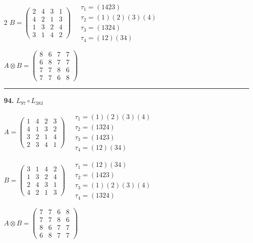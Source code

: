 \begin{multicols}{2}
$B = \begin{pmatrix} 2 & 4 & 3 & 1 \\ 4 & 2 & 1 & 3 \\ 1 & 3 & 2 & 4 \\ 3 & 1 & 4 & 2 \end{pmatrix} \quad \begin{matrix} \tau_{1}=(1 4 2 3) \\ \tau_{2}=(1)(2)(3)(4) \\ \tau_{3}=(1 3 2 4) \\ \tau_{4}=(1 2)(3 4) \end{matrix}$

$A \otimes B = \begin{pmatrix} 8 & 6 & 7 & 7 \\ 6 & 8 & 7 & 7 \\ 7 & 7 & 8 & 6 \\ 7 & 7 & 6 & 8 \end{pmatrix}$

\vspace{0.3em}
\hrule
\vspace{0.3em}

\noindent\textbf{94.} $L_{97} \circ L_{383}$

$A = \begin{pmatrix} 1 & 4 & 2 & 3 \\ 4 & 1 & 3 & 2 \\ 3 & 2 & 1 & 4 \\ 2 & 3 & 4 & 1 \end{pmatrix} \quad \begin{matrix} \tau_{1}=(1)(2)(3)(4) \\ \tau_{2}=(1 3 2 4) \\ \tau_{3}=(1 4 2 3) \\ \tau_{4}=(1 2)(3 4) \end{matrix}$

$B = \begin{pmatrix} 3 & 1 & 4 & 2 \\ 1 & 3 & 2 & 4 \\ 2 & 4 & 3 & 1 \\ 4 & 2 & 1 & 3 \end{pmatrix} \quad \begin{matrix} \tau_{1}=(1 2)(3 4) \\ \tau_{2}=(1 4 2 3) \\ \tau_{3}=(1)(2)(3)(4) \\ \tau_{4}=(1 3 2 4) \end{matrix}$

$A \otimes B = \begin{pmatrix} 7 & 7 & 6 & 8 \\ 7 & 7 & 8 & 6 \\ 8 & 6 & 7 & 7 \\ 6 & 8 & 7 & 7 \end{pmatrix}$


\end{multicols}
